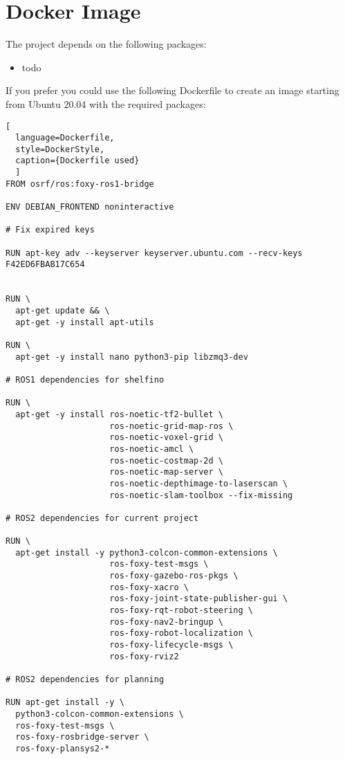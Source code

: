 \chapter{Docker Image}
\label{cha:dockerfile}

The project depends on the following packages:

\begin{itemize}
    \item todo
\end{itemize}

If you prefer you could use the following Dockerfile to create an image starting from Ubuntu 20.04 with the required packages:

\begin{lstlisting}[
  language=Dockerfile,
  style=DockerStyle,
  caption={Dockerfile used}
  ]
FROM osrf/ros:foxy-ros1-bridge

ENV DEBIAN_FRONTEND noninteractive

# Fix expired keys

RUN apt-key adv --keyserver keyserver.ubuntu.com --recv-keys F42ED6FBAB17C654


RUN \
  apt-get update && \
  apt-get -y install apt-utils

RUN \
  apt-get -y install nano python3-pip libzmq3-dev

# ROS1 dependencies for shelfino
  
RUN \
  apt-get -y install ros-noetic-tf2-bullet \
                     ros-noetic-grid-map-ros \
                     ros-noetic-voxel-grid \
                     ros-noetic-amcl \
                     ros-noetic-costmap-2d \
                     ros-noetic-map-server \
                     ros-noetic-depthimage-to-laserscan \
                     ros-noetic-slam-toolbox --fix-missing

# ROS2 dependencies for current project

RUN \
  apt-get install -y python3-colcon-common-extensions \
                     ros-foxy-test-msgs \
                     ros-foxy-gazebo-ros-pkgs \
                     ros-foxy-xacro \
                     ros-foxy-joint-state-publisher-gui \
                     ros-foxy-rqt-robot-steering \
                     ros-foxy-nav2-bringup \
                     ros-foxy-robot-localization \
                     ros-foxy-lifecycle-msgs \
                     ros-foxy-rviz2

# ROS2 dependencies for planning

RUN apt-get install -y \
  python3-colcon-common-extensions \
  ros-foxy-test-msgs \
  ros-foxy-rosbridge-server \
  ros-foxy-plansys2-*


\end{lstlisting}
